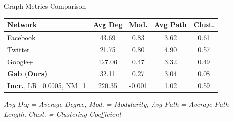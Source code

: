 \documentclass[aspectratio=169,xcolor=dvipsnames]{beamer}
\begin{document}
\begin{frame}{Graph Metrics Comparison }
	\begin{table}
		\centering
		\begin{tabular}{lcccc}
			\toprule
			\textbf{Network}                                      & \textbf{Avg Deg} & \textbf{Mod.} & \textbf{Avg Path} & \textbf{Clust.} \\
			\midrule
			Facebook                                              & 43.69            & 0.83          & 3.62              & 0.61            \\
			Twitter                                               & 21.75            & 0.80          & 4.90              & 0.57            \\
			Google+                                               & 127.06           & 0.47          & 3.32              & 0.49            \\
			\textbf{Gab (Ours)}                                   & 32.11            & 0.27          & 3.04              & 0.08            \\
			\midrule
			\textcolor{drawblue}{\textbf{Incr.}}, LR=0.0005, NM=1 & 220.35           & -0.001        & 1.02              & 0.59            \\
			\bottomrule
		\end{tabular}
	\end{table}
	\textit{Avg Deg = Average Degree, Mod. = Modularity, Avg Path = Average Path Length, Clust. = Clustering Coefficient}
\end{frame}



\end{document}
